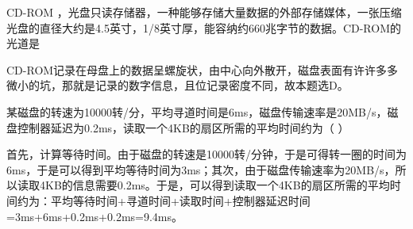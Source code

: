 \question CD-ROM
，光盘只读存储器，一种能够存储大量数据的外部存储媒体，一张压缩光盘的直径大约是4.5英寸，1/8英寸厚，能容纳约660兆字节的数据。CD-ROM的光道是
\par{}
\begin{solution}CD-ROM记录在母盘上的数据呈螺旋状，由中心向外散开，磁盘表面有许许多多微小的坑，那就是记录的数字信息，且位记录密度不同，故本题选D。
\end{solution}
\question 某磁盘的转速为10000转/分，平均寻道时间是6ms，磁盘传输速率是20MB/s，磁盘控制器延迟为0.2ms，读取一个4KB的扇区所需的平均时间约为（
）
\par{}
\begin{solution}首先，计算等待时间。由于磁盘的转速是10000转/分钟，于是可得转一圈的时间为6ms，于是可以得到平均等待时间为3ms；其次，由于磁盘传输速率为20MB/s，所以读取4KB的信息需要0.2ms。于是，可以得到读取一个4KB的扇区所需的平均时间约为：平均等待时间+寻道时间+读取时间+控制器延迟时间=3ms+6ms+0.2ms+0.2ms=9.4ms。
\end{solution}
